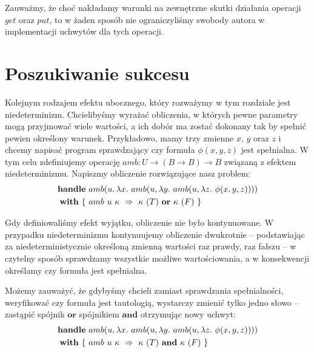Zauważmy, że choć nakładamy warunki na zewnętrzne skutki działania operacji \(get\) oraz \(put\), to w żaden sposób nie ograniczyliśmy swobody autora w implementacji uchwytów dla tych operacji.


\section{Poszukiwanie sukcesu}

Kolejnym rodzajem efektu ubocznego, który rozważymy w tym rozdziale jest niedeterminizm. Chcielibyśmy wyrażać obliczenia, w których pewne parametry mogą przyjmować wiele wartości, a ich dobór ma zostać dokonany tak by spełnić pewien określony warunek. Przykładowo, mamy trzy zmienne \(x,\, y\) oraz \(z\) i chcemy napisać program sprawdzający czy formuła \(\phi(x, y, z)\) jest spełnialna. W tym celu zdefiniujemy operację \(amb: U \rightarrow (B \rightarrow B) \rightarrow B\) związaną z efektem niedeterminizmu. Napiszmy obliczenie rozwiązujące nasz problem:
\begin{equation}\begin{split}
  \handle{
    &\op{amb}{u}{\fun{x}{
        \op{amb}{u}{\fun{y}{
            \op{amb}{u}{\fun{z}{
                \phi(x, y, z)
            }}
        }}
    }}\\
  }{ \{ \ &\hcase{amb}{u\ \kappa}{ \kappa\ (T) \ \mathbf{or} \ \kappa\ (F) } \ \} }
\end{split}\end{equation}

Gdy definiowaliśmy efekt wyjątku, obliczenie nie było kontynuowane. W przypadku niedeterminizmu kontynuujemy obliczenie dwukrotnie -- podstawiając za niedeterministycznie określoną zmienną wartości raz prawdy, raz fałszu -- w czytelny sposób sprawdzamy wszystkie możliwe wartościowania, a w konsekwencji określamy czy formuła jest spełnialna.

Możemy zauważyć, że gdybyśmy chcieli zamiast sprawdzania spełnialności, weryfikować czy formuła jest tautologią, wystarczy zmienić tylko jedno słowo -- zastąpić spójnik \(\mathbf{or}\) spójnikiem \(\mathbf{and}\) otrzymując nowy uchwyt:
\begin{equation}\begin{split}
  \handle{
    &\op{amb}{u}{\fun{x}{
        \op{amb}{u}{\fun{y}{
            \op{amb}{u}{\fun{z}{
                \phi(x, y, z)
            }}
        }}
    }}\\
  }{ \{ \ &\hcase{amb}{u\ \kappa}{ \kappa\ (T) \ \mathbf{and} \ \kappa\ (F) } \ \} }
\end{split}\end{equation}

